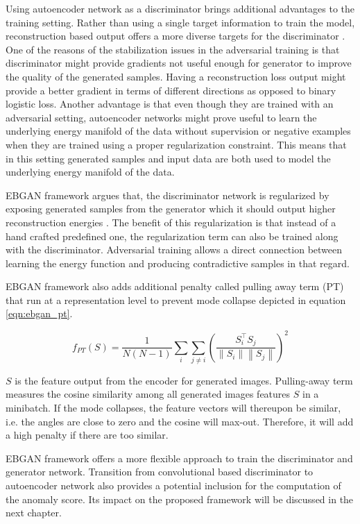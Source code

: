 Using autoencoder network as a discriminator brings additional advantages to the training setting.
Rather than using a single target information to train the model, reconstruction based output offers
a more diverse targets for the discriminator \cite{Zhao2016EnergybasedGA}. One of the reasons of the
stabilization issues in the adversarial training is that discriminator might provide gradients not
useful enough for generator to improve the quality of the generated samples. Having a reconstruction
loss output might provide a better gradient in terms of different directions as opposed to binary
logistic loss\cite{Zhao2016EnergybasedGA}. Another advantage is that even though they are trained with an adversarial setting,
autoencoder networks might prove useful to learn the underlying energy manifold of the data without
supervision or negative examples when they are trained using a proper regularization constraint.
This means that in this setting generated samples and input data are both used to model the
underlying energy manifold of the data. 

EBGAN framework argues that, the discriminator network is regularized by exposing generated samples
from the generator  which it should output higher reconstruction energies
\cite{Zhao2016EnergybasedGA}. The benefit of this regularization is that instead of a hand crafted
predefined one, the regularization term can also be trained along with the discriminator.
Adversarial training allows a direct connection between learning the energy function and producing
contradictive samples in that regard. 

EBGAN framework also adds additional penalty called pulling away term (PT) that run at a
representation level to prevent mode collapse depicted in equation \ref{eqn:ebgan_pt}.

\begin{equation}
\label{eqn:ebgan_pt}
	f_{P T}(S)=\frac{1}{N(N-1)} \sum_{i} \sum_{j \neq i}\left(\frac{S_{i}^{\top} S_{j}}{\left\|S_{i}\right\|\left\|S_{j}\right\|}\right)^{2}
\end{equation}

 $S$ is the feature output from the encoder for generated images. Pulling-away term measures the
 cosine similarity among all generated images features $S$ in a minibatch. If the mode collapses,
 the feature vectors will thereupon be similar, i.e. the angles are close to zero and the cosine
 will max-out. Therefore, it will add a high penalty if there are too similar.
 \cite{Zhao2016EnergybasedGA}
 
 EBGAN framework offers a more flexible approach to train the discriminator and generator network. 
 Transition from convolutional based discriminator to autoencoder network also provides a potential inclusion 
 for the computation of the anomaly score. Its impact on the proposed framework will be discussed in the next chapter. 

\endgroup
